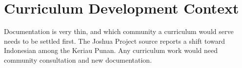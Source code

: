 \documentclass[12pt]{article}
\begin{document}
\section{Curriculum Development Context}
Documentation is very thin, and which community a curriculum would serve needs to be settled first. The Joshua Project source reports a shift toward Indonesian among the Keriau Punan. Any curriculum work would need community consultation and new documentation.
\end{document}
